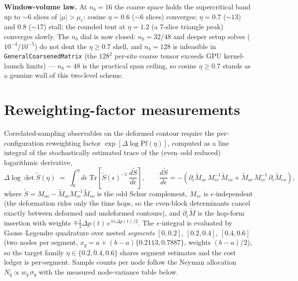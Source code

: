 \documentclass[11pt]{article}
\newcommand{\Mt}{\widetilde{M}}
\newcommand{\muc}{\mu_c}
\begin{document}
\medskip
\noindent\textbf{Window-volume law.}  At $n_b=16$ the coarse space holds
the supercritical band up to $\sim6$ slices of $|\mu|>\muc$: cosine
$\eta=0.6$ ($\sim6$ slices) converges; $\eta=0.7$ ($\sim13$) and $0.8$
($\sim17$) stall; the rounded tent at $\eta=1.2$ (a 7-slice triangle
peak) converges slowly.  The $n_b$ dial is now closed: $n_b=32/48$ and
deeper setup solves ($10^{-4}$/$10^{-5}$) do not dent the $\eta\geq0.7$
shell, and $n_b=128$ is infeasible in \texttt{GeneralCoarsenedMatrix}
(the $128^2$ per-site coarse tensor exceeds GPU kernel-launch limits) ---
$n_b=48$ is the practical span ceiling, so cosine $\eta\geq0.7$ stands as
a genuine wall of this two-level scheme.

\section{Reweighting-factor measurements}
\label{sec:rwf}
Correlated-sampling observables on the deformed contour require the
per-configuration reweighting factor
$\exp[\Delta\log\mathrm{Pf}(\eta)]$, computed as a line integral of the
stochastically estimated trace of the (even--odd reduced) logarithmic
derivative,
\begin{equation}
\Delta\log\det \tilde S(\eta)
\;=\; \int_0^{\eta} d\epsilon\;
\mathrm{Tr}\!\left[\tilde S(\epsilon)^{-1}\,
\frac{d\tilde S}{d\epsilon}\right],
\qquad
\frac{d\tilde S}{d\epsilon}
= -\left(\partial_\epsilon\Mt_{oe}\,M_{ee}^{-1}\Mt_{eo}
+ \Mt_{oe}\,M_{ee}^{-1}\,\partial_\epsilon\Mt_{eo}\right),
\end{equation}
where $\tilde S = M_{oo} - \Mt_{oe} M_{ee}^{-1} \Mt_{eo}$ is the odd
Schur complement, $M_{ee}$ is $\epsilon$-independent (the deformation
rides only the time hops, so the even-block determinants cancel exactly
between deformed and undeformed contours), and
$\partial_\epsilon \Mt$ is the hop-form insertion with weights
$\mp\tfrac12 \Delta p(t)\,e^{\mp\epsilon\Delta p(t)/2}$.  The
$\epsilon$-integral is evaluated by Gauss--Legendre quadrature over
nested \emph{segments} $[0,0.2]$, $[0.2,0.4]$, $[0.4,0.6]$ (two nodes
per segment, $x_q = a + (b-a)\{0.2113, 0.7887\}$, weights
$(b-a)/2$), so the target family $\eta \in \{0.2, 0.4, 0.6\}$ shares
segment estimates and the cost ledger is per-segment.  Sample counts
per node follow the Neyman allocation $N_q \propto w_q\,\sigma_q$ with
the measured node-variance table below.
\end{document}
